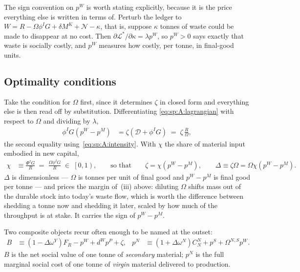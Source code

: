 The sign convention on $p^W$ is worth stating explicitly, because it is the price everything else is
written in terms of. Perturb the ledger to $W=R-\Omega\phi^IG+\delta M^K+\mathcal N-\kappa$, that is,
suppose $\kappa$ tonnes of waste could be made to disappear at no cost. Then
$\partial\mathcal L^*/\partial\kappa=\lambda p^W$, so $p^W>0$ says exactly that waste is socially
costly, and $p^W$ measures how costly, per tonne, in final-good units.


\subsection{Optimality conditions}\label{sec:sp:A:foc}\label{sec:sp:A:costates}

 Take the condition for $\Omega$ first, since it determines $\zeta$
in closed form and everything else is then read off by substitution. Differentiating
\eqref{eq:sp:A:lagrangian} with respect to $\Omega$ and dividing by $\lambda$,
\begin{align}
\phi^IG\left(p^W-p^M\right) &= \zeta\left(\mathcal D+\phi^IG\right)
\;=\;\zeta\,\frac{R}{\Omega},
\label{eq:sp:A:foc:Omega}
\end{align}
the second equality using~\eqref{eq:sp:A:intensity}. With $\chi$ the share of material input embodied
in new capital,
\begin{align}
\chi &\equiv \frac{\Phi^IG}{R}\;=\;\frac{\Omega\phi^IG}{R}\;\in\;\left[0,1\right),
\qquad\text{so that}\qquad
\zeta = \chi\left(p^W-p^M\right),
\qquad
\Delta \equiv \zeta\Omega = \Omega\chi\left(p^W-p^M\right).
\label{eq:sp:A:zeta}
\end{align}
$\Delta$ is dimensionless --- $\Omega$ is tonnes per unit of final good and $p^W-p^M$ is final good
per tonne --- and prices the margin of~(iii) above: diluting $\Omega$ shifts mass out of the durable
stock into today's waste flow, which is worth the difference between shedding a tonne now and
shedding it later, scaled by how much of the throughput is at stake. It carries the sign of
$p^W-p^M$.

Two composite objects recur often enough to be named at the outset:
\begin{align}
B &\equiv \left(1-\Delta\omega^Y\right)F_R-p^W+d^Wp^P+\zeta,
&
p^N &\equiv \left(1+\Delta\omega^N\right)C^N_N+p^S+\Omega^{N,S}p^W .
\label{eq:sp:A:Bvalue}
\end{align}
$B$ is the net social value of one tonne of \emph{secondary} material; $p^N$ is the full marginal
social cost of one tonne of \emph{virgin} material delivered to production.

